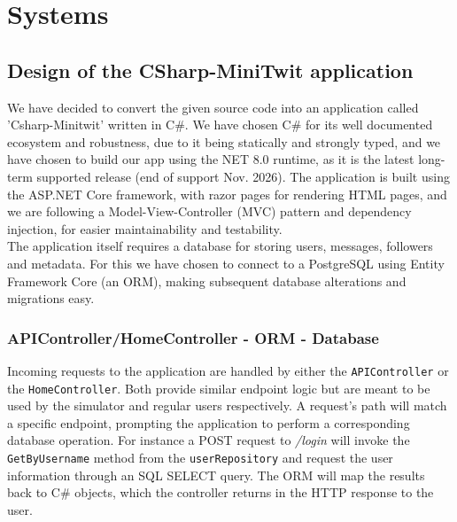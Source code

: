 \section{Systems}
\subsection{Design of the CSharp-MiniTwit application} \label{Design of the CSharp-MiniTwit application}
We have decided to convert the given source code into an application called 'Csharp-Minitwit' written in C\#.\newline
We have chosen C\# for its well documented ecosystem and robustness, due to it being statically and strongly typed, and we have chosen to build our app using the NET 8.0 runtime, as it is the latest long-term supported release (end of support Nov. 2026)\cite{netcoresupport}. \newline
The application is built using the ASP.NET Core framework\cite{aspnetcoreintro2023}, with razor pages for rendering HTML pages, and we are following a Model-View-Controller (MVC) pattern and dependency injection, for easier maintainability and testability.\\

The application itself requires a database for storing users, messages, followers and metadata. For this we have chosen to connect to a PostgreSQL using Entity Framework Core (an ORM), making subsequent database alterations and migrations easy.

\subsubsection{APIController/HomeController - ORM - Database} 
Incoming requests to the application are handled by either the \texttt{APIController} or the \texttt{HomeController}. Both provide similar endpoint logic but are meant to be used by the simulator and regular users respectively. A request's path will match a specific endpoint, prompting the application to perform a corresponding database operation. For instance a POST request to \textit{/login} will invoke the \texttt{GetByUsername} method from the \texttt{userRepository} and request the user information through an SQL SELECT query. The ORM will map the results back to C\# objects, which the controller returns in the HTTP response to the user.

